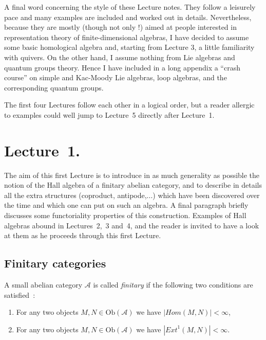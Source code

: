 \documentclass[a4paper,10pt]{amsart}
\numberwithin{equation}{section}
\begin{document}
\vspace{.3in}

A final word concerning the style of these Lecture notes. They follow a leisurely pace and many examples are included and worked out in details. Nevertheless, because they are mostly (though not only !) aimed at people interested in representation theory of finite-dimensional algebras, I have decided to assume some basic homological algebra and, starting from Lecture 3, a little familiarity with quivers. On the other hand, I assume nothing from Lie algebras and quantum groups theory. Hence I have included in a long appendix a ``crash course'' on simple and Kac-Moody Lie algebras, loop algebras, and the corresponding quantum groups.

The first four Lectures follow each other in a logical order, but a reader allergic to examples could well jump to Lecture~5 directly after Lecture~1.

\newpage

\section{Lecture~1.}

\setcounter{section}{1}

\vspace{.2in}

The aim of this first Lecture is to introduce in as much generality as possible the notion of the Hall algebra of a finitary abelian category, and to describe in details all the extra structures (coproduct, antipode,...) which have been discovered over the time and which one can put on such an algebra. A final paragraph briefly discusses some functoriality properties of this construction. Examples of Hall algebras abound in Lectures~2,~3 and~4, and the reader is invited to have a look at them as he proceeds through this first Lecture.

\vspace{.15in}

\subsection{Finitary categories}

\vspace{.15in}

A small abelian category $\mathcal{A}$ is called \textit{finitary} if the following two conditions are satisfied~:
\begin{enumerate}
\item[i)] For any two objects $M,N \in \text{Ob}(\mathcal{A})$ we have $|{Hom}(M,N)| < \infty$,
\item[ii)]For any two objects $M,N \in \text{Ob}(\mathcal{A})$ we have $|{Ext}^1(M,N)| < \infty$.
\end{enumerate}
\end{document}
